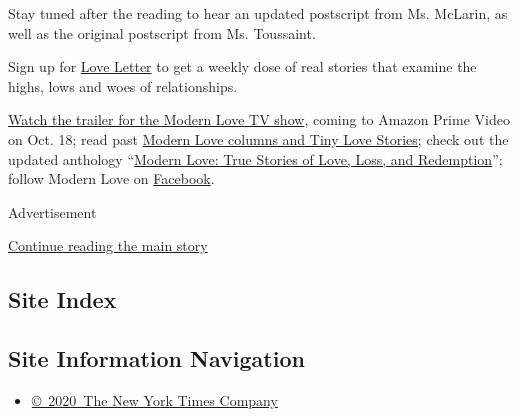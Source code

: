 Stay tuned after the reading to hear an updated postscript from Ms.
McLarin, as well as the original postscript from Ms. Toussaint.

Sign up for
\href{https://www.nytimes3xbfgragh.onion/newsletters/love-letter}{Love
Letter} to get a weekly dose of real stories that examine the highs,
lows and woes of relationships.

\href{https://www.nytimes3xbfgragh.onion/2019/09/12/style/modern-love-tv-show-trailer.html}{Watch
the trailer for the Modern Love TV show}, coming to Amazon Prime Video
on Oct. 18; read past
\href{https://www.nytimes3xbfgragh.onion/column/modern-love}{Modern Love
columns and Tiny Love Stories}; check out the updated anthology
``\href{https://www.penguinrandomhouse.com/books/623036/modern-love-revised-and-updated-by-edited-by-daniel-jones-with-contributions-by-andrew-rannells-ayelet-waldman-amy-krouse-rosenthal-veronica-chambers-and-more/}{Modern
Love: True Stories of Love, Loss, and Redemption}''; follow Modern Love
on \href{https://www.facebookcorewwwi.onion/modernlove}{Facebook}.

Advertisement

\protect\hyperlink{after-bottom}{Continue reading the main story}

\hypertarget{site-index}{%
\subsection{Site Index}\label{site-index}}

\hypertarget{site-information-navigation}{%
\subsection{Site Information
Navigation}\label{site-information-navigation}}

\begin{itemize}
\tightlist
\item
  \href{https://help.nytimes3xbfgragh.onion/hc/en-us/articles/115014792127-Copyright-notice}{©~2020~The
  New York Times Company}
\end{itemize}

